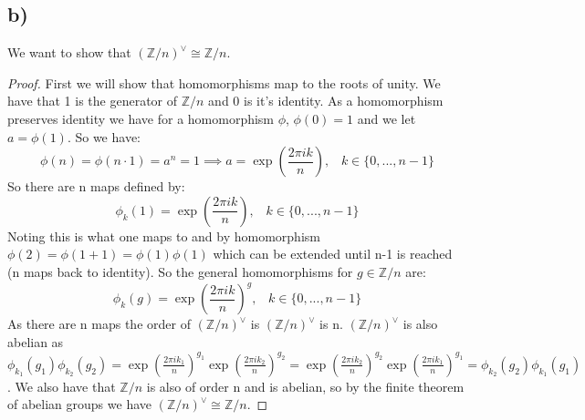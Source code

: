 \documentclass{article}
\begin{document}
\subsection*{b)}
We want to show that $(\mathbb{Z}/n)^\vee\cong\mathbb{Z}/n$.
\begin{proof}
First we will show that homomorphisms map to the roots of unity. We have that 1 is the generator of $\mathbb{Z}/n$ and 0 is it's identity. As a homomorphism preserves identity we have for a homomorphism $\phi$, $\phi(0)=1$ and we let $a=\phi(1)$. So we have:
$$\phi(n)=\phi(n\cdot1)=a^n=1\implies a=\exp\left(\frac{2\pi ik}{n}\right),\;\;\;k\in\{0,...,n-1\}$$
So there are n maps defined by:
$$\phi_k(1)=\exp\left(\frac{2\pi ik}{n}\right),\;\;\;k\in\{0,...,n-1\}$$
Noting this is what one maps to and by homomorphism $\phi(2)=\phi(1+1)=\phi(1)\phi(1)$ which can be extended until n-1 is reached (n maps back to identity). So the general homomorphisms for $g\in\mathbb{Z}/n$ are:
$$\phi_k(g)=\exp\left(\frac{2\pi ik}{n}\right)^g,\;\;\;k\in\{0,...,n-1\}$$
As there are n maps the order of $(\mathbb{Z}/n)^\vee$ is $(\mathbb{Z}/n)^\vee$ is n. $(\mathbb{Z}/n)^\vee$ is also abelian as $\phi_{k_1}(g_1)\phi_{k_2}(g_2)=\exp\left(\frac{2\pi ik_1}{n}\right)^{g_1}\exp\left(\frac{2\pi ik_2}{n}\right)^{g_2}=\exp\left(\frac{2\pi ik_2}{n}\right)^{g_2}\exp\left(\frac{2\pi ik_1}{n}\right)^{g_1}=\phi_{k_2}(g_2)\phi_{k_1}(g_1)$. We also have that $\mathbb{Z}/n$ is also of order n and is abelian, so by the finite theorem of abelian groups we have $(\mathbb{Z}/n)^\vee\cong\mathbb{Z}/n$.
\end{proof}
\end{document}
